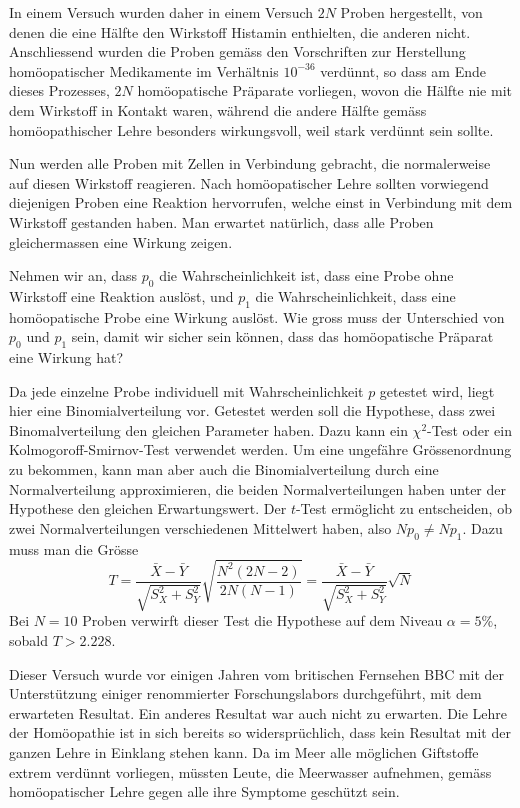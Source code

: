 In einem Versuch wurden daher in einem Versuch $2N$ Proben hergestellt,
von denen die eine Hälfte den Wirkstoff Histamin enthielten, die anderen 
nicht.
Anschliessend wurden die Proben gemäss den Vorschriften zur
Herstellung homöopatischer Medikamente im Verhältnis $10^{-36}$
verdünnt, so dass am Ende dieses Prozesses, $2N$ homöopatische
Präparate vorliegen, wovon die Hälfte nie mit dem Wirkstoff in
Kontakt waren, während die andere Hälfte gemäss homöopathischer
Lehre besonders wirkungsvoll, weil stark verdünnt sein sollte.

Nun werden alle Proben mit Zellen in Verbindung gebracht, die normalerweise
auf diesen Wirkstoff reagieren.
Nach homöopatischer Lehre sollten vorwiegend
diejenigen Proben eine Reaktion hervorrufen, welche einst in Verbindung
mit dem Wirkstoff gestanden haben.
Man erwartet natürlich, dass 
alle Proben gleichermassen eine Wirkung zeigen.

Nehmen wir an, dass $p_0$ die Wahrscheinlichkeit ist, dass eine Probe ohne
Wirkstoff eine Reaktion auslöst, und $p_1$ die Wahrscheinlichkeit, dass
eine homöopatische Probe eine Wirkung auslöst.
Wie gross muss der Unterschied
von $p_0$ und $p_1$ sein, damit wir sicher sein können, dass das homöopatische
Präparat eine Wirkung hat?

Da jede einzelne Probe individuell mit Wahrscheinlichkeit $p$ getestet wird, liegt
hier eine Binomialverteilung vor.
Getestet werden soll die Hypothese, dass zwei
Binomalverteilung den gleichen Parameter haben.
Dazu kann ein $\chi^2$-Test oder
ein Kolmogoroff-Smirnov-Test verwendet werden.
Um eine ungefähre Grössenordnung
zu bekommen, kann man aber auch die Binomialverteilung durch eine Normalverteilung
approximieren, die beiden Normalverteilungen haben unter der Hypothese den
gleichen Erwartungswert.
Der $t$-Test ermöglicht zu entscheiden, ob zwei Normalverteilungen
verschiedenen Mittelwert haben, also $Np_0\ne Np_1$.
Dazu muss man die
Grösse
$$T=\frac{\bar X - \bar Y}{\sqrt{S_X^2+S_Y^2}}\sqrt{\frac{N^2(2N-2)}{{2N}{(N-1)}}}
=
\frac{\bar X - \bar Y}{\sqrt{S_X^2+S_Y^2}}\sqrt{N}$$
Bei $N=10$ Proben verwirft dieser Test die Hypothese
auf dem Niveau $\alpha=5\%$, sobald
$T>2.228$.

Dieser Versuch wurde vor einigen Jahren vom britischen Fernsehen BBC mit der
Unterstützung einiger renommierter Forschungslabors durchgeführt, mit dem
erwarteten Resultat.
Ein anderes Resultat war auch nicht zu erwarten.
Die Lehre der Homöopathie
ist in sich bereits so widersprüchlich, dass kein Resultat mit der ganzen
Lehre in Einklang stehen kann.
Da im Meer alle möglichen Giftstoffe extrem verdünnt vorliegen, müssten
Leute, die Meerwasser aufnehmen, gemäss homöopatischer Lehre gegen alle
ihre Symptome geschützt sein.

